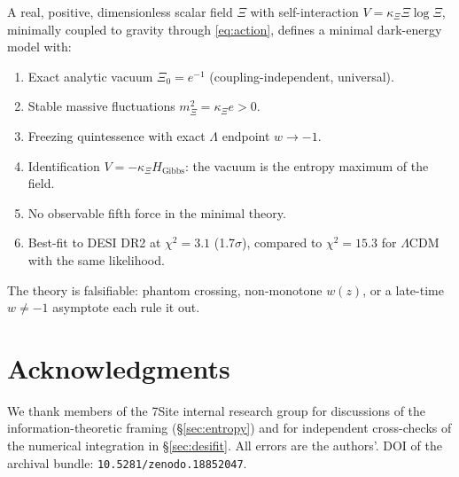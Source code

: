 \documentclass[11pt,reqno]{amsart}
\theoremstyle{plain}
\theoremstyle{definition}
\theoremstyle{remark}
\newcommand{\Gibbs}{\mathrm{Gibbs}}
\begin{document}
A real, positive, dimensionless scalar field $\Xi$ with self-interaction
$V=\kappa_\Xi\Xi\log\Xi$, minimally coupled to gravity through
\eqref{eq:action}, defines a minimal dark-energy model with:
\begin{enumerate}
  \item Exact analytic vacuum $\Xi_0=e^{-1}$ (coupling-independent, universal).
  \item Stable massive fluctuations $m_\Xi^{2}=\kappa_\Xi e>0$.
  \item Freezing quintessence with exact $\Lambda$ endpoint $w\to-1$.
  \item Identification $V=-\kappa_\Xi H_{\Gibbs}$: the vacuum is the
        entropy maximum of the field.
  \item No observable fifth force in the minimal theory.
  \item Best-fit to DESI DR2 at $\chi^{2}=3.1$ (1.7$\sigma$), compared to
        $\chi^{2}=15.3$ for $\Lambda$CDM with the same likelihood.
\end{enumerate}
The theory is falsifiable: phantom crossing, non-monotone $w(z)$, or a
late-time $w\neq-1$ asymptote each rule it out.

\section*{Acknowledgments}

We thank members of the 7Site internal research group for discussions of the
information-theoretic framing (\S\ref{sec:entropy}) and for independent
cross-checks of the numerical integration in \S\ref{sec:desifit}. All errors
are the authors'. DOI of the archival bundle: \texttt{10.5281/zenodo.18852047}.
\end{document}
